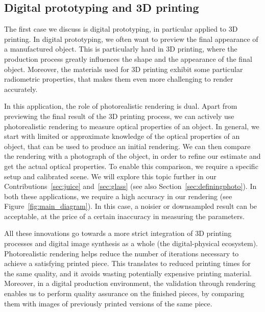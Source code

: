 \subsection{Digital prototyping and 3D printing}
The first case we discuss is digital prototyping, in particular applied to 3D printing. In digital prototyping, we often want to preview the final appearance of a manufactured object. This is particularly hard in 3D printing, where the production process greatly influences the shape and the appearance of the final object. Moreover, the materials used for 3D printing exhibit some particular radiometric properties, that makes them even more challenging to render accurately. 

In this application, the role of photorealistic rendering is dual. Apart from previewing the final result of the 3D printing process, we can actively use photorealistic rendering to measure optical properties of an object. In general, we start with limited or approximate knowledge of the optical properties of an object, that can be used to produce an initial rendering. We can then compare the rendering with a photograph of the object, in order to refine our estimate and get the actual optical properties. To enable this comparison, we require a specific setup and calibrated scene. We will explore this topic further in our Contributions~\ref{sec:juice} and~\ref{sec:glass} (see also Section~\ref{sec:definingphoto}). In both these applications, we require a high accuracy in our rendering (see Figure~\ref{fig:main_diagram}). In this case, a noisier or downsampled result can be acceptable, at the price of a certain inaccuracy in measuring the parameters. 

All these innovations go towards a more strict integration of 3D printing processes and digital image synthesis as a whole (the digital-physical ecosystem). Photorealistic rendering helps reduce the number of iterations necessary to achieve a satisfying printed piece. This translates to reduced printing times for the same quality, and it avoids wasting potentially expensive printing material. Moreover, in a digital production  environment, the validation through rendering enables us to perform quality assurance on the finished pieces, by comparing them with images of previously printed versions of the same piece.
